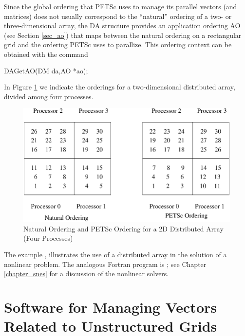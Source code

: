 Since the global ordering that PETSc uses to manage its parallel vectors 
(and matrices) does not usually correspond to the ``natural'' ordering 
of a two- or three-dimensional array, the DA structure provides 
an application ordering AO (see Section \ref{sec_ao}) that maps 
between the natural ordering on a rectangular grid and the ordering PETSc
uses to parallize. This ordering context can be obtained with the command
\begin{tabbing}
  DAGetAO(DM da,AO *ao);
\end{tabbing}
In Figure \ref{fig_daao} we indicate the orderings for a two-dimensional distributed 
array, divided among four processes.

\begin{figure}[tb]
\centerline{ \includegraphics{danumbering}}
\caption{Natural Ordering and PETSc Ordering for a 2D Distributed Array (Four Processes)}
\label{fig_daao}
\end{figure}

The example
,
illustrates the use of a distributed array in the solution of
a nonlinear problem.  The analogous Fortran program is
\break {};
see Chapter \ref{chapter_snes} for a discussion of the nonlinear
solvers.


\section{Software for Managing Vectors Related to Unstructured Grids}
\label{sec_unstruct}

